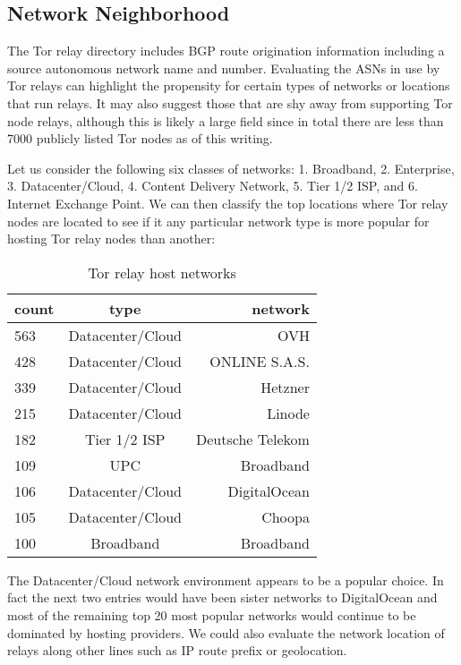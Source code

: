 \documentclass[sigconf]{acmart}
\begin{document}
\subsection{Network Neighborhood}

The Tor relay directory includes BGP route origination information
including a source autonomous network name and number.  Evaluating the
ASNs in use by Tor relays can highlight the propensity for certain types
of networks or locations that run relays.  It may also suggest those
that are shy away from supporting Tor node relays, although this is
likely a large field since in total there are less than 7000 publicly
listed Tor nodes as of this writing.

Let us consider the following six classes of networks: 1. Broadband, 2.
Enterprise, 3. Datacenter/Cloud, 4. Content Delivery Network, 5. Tier 1/2 ISP,
and 6. Internet Exchange Point.  We can then classify the top locations where Tor relay
nodes are located to see if it any particular network type is more
popular for hosting Tor relay nodes than another:

\begin{center}
  \begin{table}[h]
  \begin{tabular} { l | c | r }
  \hline
  count & type & network \\ \hline
  563 & Datacenter/Cloud & OVH \\ \hline
  428 & Datacenter/Cloud & ONLINE S.A.S.  \\ \hline
  339 & Datacenter/Cloud & Hetzner \\ \hline
  215 & Datacenter/Cloud & Linode \\ \hline
  182 & Tier 1/2 ISP & Deutsche Telekom \\ \hline
  109 & UPC & Broadband \\ \hline
  106 & Datacenter/Cloud & DigitalOcean \\ \hline
  105 & Datacenter/Cloud & Choopa \\ \hline
  100 & Broadband & Broadband \\ \hline
  \hline
  \end{tabular}
  \caption{Tor relay host networks}
  \end{table}
\end{center}

The Datacenter/Cloud network environment appears to be a popular choice.
In fact the next two entries would have been sister networks to
DigitalOcean and most of the remaining top 20 most popular networks
would continue to be dominated by hosting providers.  We could also
evaluate the network location of relays along other lines such as IP
route prefix or geolocation.
\end{document}

